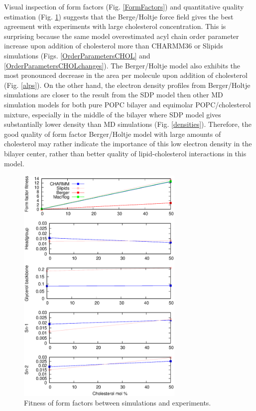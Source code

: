 \documentclass[aps,prl,superscriptaddress,twocolumn]{revtex4}
\begin{document}
Visual inspection of form factors (Fig. \ref{FormFactors}) and quantitative quality estimation (Fig. \ref{FormFactorsFITNESS})
suggests that the Berge/Holtje force field gives the best agreement with experiments with large
cholesterol concentration. This is surprising because the same model overestimated acyl chain
order parameter increase upon addition of cholesterol more than CHARMM36 or Slipids simulations
(Figs. \ref{OrderParametersCHOL} and \ref{OrderParametersCHOLchanges}).
The Berger/Holtje model also exhibits the most pronounced decrease in the area per molecule
upon addition of cholesterol (Fig. \ref{alps}).
On the other hand, the electron density profiles from Berger/Holtje simulations are closer
to the result from the SDP model then other MD simulation models for both pure POPC bilayer
and equimolar POPC/cholesterol mixture, especially in the middle of the bilayer
where SDP model gives substantially lower density than MD simulations (Fig. \ref{densities}).
Therefore, the good quality of form factor Berger/Holtje model with large amounts of cholesterol
may rather indicate the importance of this low electron density in the bilayer center,
rather than better quality of lipid-cholesterol interactions in this model.
\begin{figure}[]
  \centering
  \includegraphics[width=8cm]{../FIGS/FFfitness.eps}
  \caption{\label{FormFactorsFITNESS}
    Fitness of form factors between simulations and experiments.
  }
\end{figure}
\end{document}
